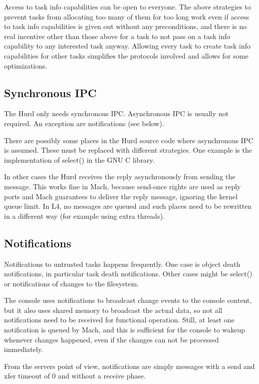 \documentclass[9pt,a4paper]{extarticle}
\begin{document}
Access to task info capabilities can be open to everyone.  The above
strategies to prevent tasks from allocating too many of them for too
long work even if access to task info capabilities is given out
without any preconditions, and there is no real incentive other than
those above for a task to not pass on a task info capability to any
interested task anyway.  Allowing every task to create task info
capabilities for other tasks simplifies the protocols involved and
allows for some optimizations.


\subsection{Synchronous IPC}
  
The Hurd only needs synchronous IPC.  Asynchronous IPC is usually not
required.  An exception are notifications (see below).
  
There are possibly some places in the Hurd source code where
asynchronous IPC is assumed.  These must be replaced with different
strategies.  One example is the implementation of select() in the GNU
C library.
  
In other cases the Hurd receives the reply asynchronously from sending
the message.  This works fine in Mach, because send-once rights are
used as reply ports and Mach guarantees to deliver the reply message,
ignoring the kernel queue limit.  In L4, no messages are queued and
such places need to be rewritten in a different way (for example using
extra threads).

\subsection{Notifications}
  
Notifications to untrusted tasks happens frequently.  One case is
object death notifications, in particular task death notifications.
Other cases might be select() or notifications of changes to the
filesystem.
  
The console uses notifications to broadcast change events to the
console content, but it also uses shared memory to broadcast the
actual data, so not all notifications need to be received for
functional operation.  Still, at least one notification is queued by
Mach, and this is sufficient for the console to wakeup whenever
changes happened, even if the changes can not be processed
immediately.
  
From the servers point of view, notifications are simply messages with
a send and xfer timeout of 0 and without a receive phase.
  
\end{document}
